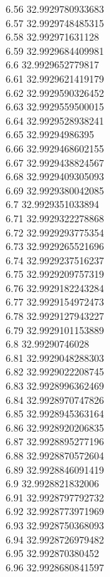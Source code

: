 {6.56	32.9929780933683\\
6.57	32.9929748485315\\
6.58	32.992971631128\\
6.59	32.9929684409981\\
6.6	32.9929652779817\\
6.61	32.9929621419179\\
6.62	32.9929590326452\\
6.63	32.9929559500015\\
6.64	32.9929528938241\\
6.65	32.99294986395\\
6.66	32.9929468602155\\
6.67	32.9929438824567\\
6.68	32.9929409305093\\
6.69	32.9929380042085\\
6.7	32.9929351033894\\
6.71	32.9929322278868\\
6.72	32.9929293775354\\
6.73	32.9929265521696\\
6.74	32.9929237516237\\
6.75	32.9929209757319\\
6.76	32.9929182243284\\
6.77	32.9929154972473\\
6.78	32.9929127943227\\
6.79	32.9929101153889\\
6.8	32.99290746028\\
6.81	32.9929048288303\\
6.82	32.9929022208745\\
6.83	32.9928996362469\\
6.84	32.9928970747826\\
6.85	32.9928945363164\\
6.86	32.9928920206835\\
6.87	32.9928895277196\\
6.88	32.9928870572604\\
6.89	32.9928846091419\\
6.9	32.9928821832006\\
6.91	32.9928797792732\\
6.92	32.9928773971969\\
6.93	32.9928750368093\\
6.94	32.9928726979482\\
6.95	32.992870380452\\
6.96	32.9928680841597\\
}
